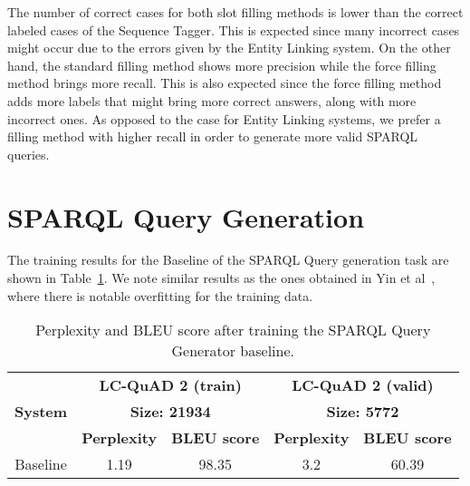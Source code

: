 The number of correct cases for both slot filling methods is lower than the correct labeled cases 
of the Sequence Tagger. This is expected since many incorrect cases might occur due to the errors 
given by the Entity Linking system. On the other hand, the standard filling method shows more 
precision while the force filling method brings more recall. This is also expected since the force 
filling method adds more labels that might bring more correct answers, along with more incorrect 
ones. As opposed to the case for Entity Linking systems, we prefer a filling method with higher 
recall in order to generate more valid SPARQL queries.

\section{SPARQL Query Generation}
\label{cap5:results/sparqlQuery}

The training results for the Baseline of the SPARQL Query generation task are shown in 
Table~\ref{table:queryGenerationTraining}. We note similar results as the ones obtained in 
Yin et al~\cite{nmt:nl-to-sparql-Yin19}, where there is notable overfitting for the training data.

\begin{table}[h!]
    \centering
    \begin{tabular}{|c|cc|cc|}
    \hline
    \multirow{3}{*}{\textbf{System}} & \multicolumn{2}{c|}{\textbf{LC-QuAD 2 (train)}}                         & \multicolumn{2}{c|}{\textbf{LC-QuAD 2 (valid)}}                         \\ \cline{2-5} 
                                     & \multicolumn{2}{c|}{\textbf{Size: 21934}}                               & \multicolumn{2}{c|}{\textbf{Size: 5772}}                                \\ \cline{2-5} 
                                     & \multicolumn{1}{c|}{\textbf{Perplexity}} & \textbf{BLEU score} & \multicolumn{1}{c|}{\textbf{Perplexity}} & \textbf{BLEU score} \\ \hline
    Baseline                         & 1.19                                     & 98.35               & 3.2                                      & 60.39               \\ \hline
    \end{tabular}%
    \caption{Perplexity and BLEU score after training the SPARQL Query Generator baseline.}
    \label{table:queryGenerationTraining}
\end{table}

